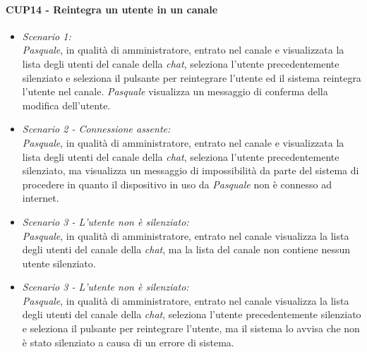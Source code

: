\paragraph{CUP14 - Reintegra un utente in un canale\\}
\begin{itemize}
	\item \textit{Scenario 1:\\}
	\textit{Pasquale}, in qualità di amministratore, entrato nel canale e visualizzata la lista degli utenti del canale della \textit{chat}, seleziona l’utente precedentemente silenziato e seleziona il pulsante per reintegrare l’utente ed il sistema reintegra l’utente nel canale. \textit{Pasquale} visualizza un messaggio di conferma della modifica dell’utente.\\
	
	\item \textit{Scenario 2 - Connessione assente:\\}
	\textit{Pasquale}, in qualità di amministratore, entrato nel canale e visualizzata la lista degli utenti del canale della \textit{chat}, seleziona l’utente precedentemente silenziato, ma visualizza un messaggio di impossibilità da parte del sistema di procedere in quanto il dispositivo in uso da \textit{Pasquale} non è connesso ad internet. \\
	
	\item \textit{Scenario 3 - L'utente non è silenziato:\\}
	\textit{Pasquale}, in qualità di amministratore, entrato nel canale visualizza la lista degli utenti del canale della \textit{chat}, ma la lista del canale non contiene nessun utente silenziato.\\
	
	\item \textit{Scenario 3 - L'utente non è silenziato:\\}
	\textit{Pasquale}, in qualità di amministratore, entrato nel canale visualizza la lista degli utenti del canale della \textit{chat}, seleziona l’utente precedentemente silenziato e seleziona il pulsante per reintegrare l’utente, ma il sistema lo avvisa che non è stato silenziato a causa di un errore di sistema. 
\end{itemize}

